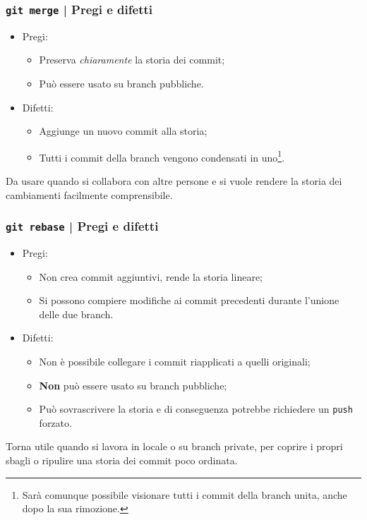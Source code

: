 \documentclass{beamer}
\begin{document}
\begin{frame}
  \frametitle{\texttt{git merge} | Pregi e difetti}
  \begin{itemize}
    \item Pregi: \begin{itemize}
      \item Preserva \emph{chiaramente} la storia dei commit;
      \item Pu\`o essere usato su branch pubbliche.
    \end{itemize}
    \item Difetti: \begin{itemize}
      \item Aggiunge un nuovo commit alla storia;
      \item Tutti i commit della branch vengono condensati in uno\footnote{
          Sar\`a comunque possibile visionare tutti i commit della branch unita,
          anche dopo la sua rimozione.
        }.
    \end{itemize}
  \end{itemize}

  Da usare quando si collabora con altre persone e si vuole rendere la storia
  dei cambiamenti facilmente comprensibile.
\end{frame}

\begin{frame}
  \frametitle{\texttt{git rebase} | Pregi e difetti}
  \begin{itemize}
    \item Pregi: \begin{itemize}
      \item Non crea commit aggiuntivi, rende la storia lineare;
      \item Si possono compiere modifiche ai commit precedenti durante l'unione
        delle due branch.
    \end{itemize}
    \item Difetti: \begin{itemize}
      \item Non \`e possibile collegare i commit riapplicati a quelli originali;
      \item \textbf{Non} pu\`o essere usato su branch pubbliche;
      \item Pu\`o sovrascrivere la storia e di conseguenza potrebbe
        richiedere un \texttt{push} forzato.
    \end{itemize}
  \end{itemize}

  Torna utile quando si lavora in locale o su branch private, per coprire i
  propri sbagli o ripulire una storia dei commit poco ordinata.
\end{frame}
\end{document}
